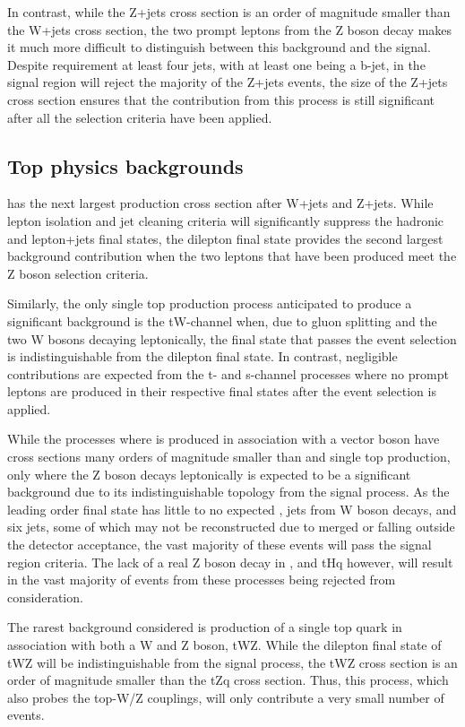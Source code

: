 In contrast, while the Z+jets cross section is an order of magnitude smaller than the W+jets cross section, the two prompt leptons from the Z boson decay makes it much more difficult to distinguish between this background and the signal.
Despite requirement at least four jets, with at least one being a b-jet, in the signal region will reject the majority of the Z+jets events, the size of the Z+jets cross section ensures that the contribution from this process is still significant after all the selection criteria have been applied.

\subsection{Top physics backgrounds}
\ttbar has the next largest production cross section after W+jets and Z+jets.
While lepton isolation and jet cleaning criteria will significantly suppress the hadronic and lepton+jets final states, the dilepton final state provides the second largest background contribution when the two leptons that have been produced meet the Z boson selection criteria.

Similarly, the only single top production process anticipated to produce a significant background is the tW-channel when, due to gluon splitting and the two W bosons decaying leptonically, the final state that passes the event selection is indistinguishable from the \ttbar dilepton final state.
In contrast, negligible contributions are expected from the t- and s-channel processes
where no prompt leptons are produced in their respective final states after the event selection is applied.

While the processes where \ttbar is produced in association with a vector boson have cross sections many orders of magnitude smaller than \ttbar and single top production, only \ttbarZ where the Z boson decays leptonically is expected to be a significant background due to its indistinguishable topology from the signal process.
As the leading order final state has little to no expected \MET, jets from W boson decays, and six jets,
some of which may not be reconstructed due to merged or falling outside the detector acceptance, the vast majority of these events will pass the signal region criteria.
The lack of a real Z boson decay in \ttbarW, \ttbarH and tHq however, will result in the vast majority of events from these processes being rejected from consideration.

The rarest background considered is production of a single top quark in association with both a W and Z boson, tWZ.
While the dilepton final state of tWZ will be indistinguishable from the signal process, the tWZ cross section is an order of magnitude smaller than the tZq cross section.
Thus, this process, which also probes the top-W/Z couplings, will only contribute a very small number of events.

